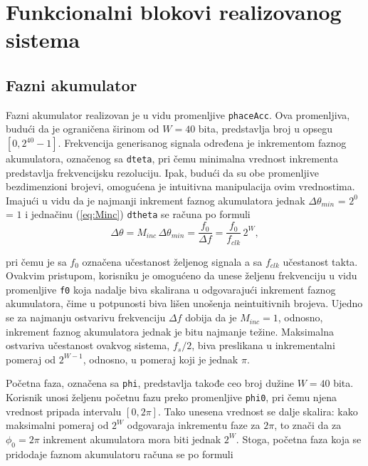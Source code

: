 \documentclass[conference]{IEEEtran}
\begin{document}
\section{Funkcionalni blokovi realizovanog sistema}\label{sekcija:kod}
\subsection{Fazni akumulator}
Fazni akumulator realizovan je u vidu promenljive \texttt{phaceAcc}. Ova promenljiva, budući da je ograničena širinom od $W=40$ bita, predstavlja broj u opsegu $[0, 2^{40}-1]$. Frekvencija generisanog signala određena je inkrementom faznog akumulatora, označenog sa \texttt{dteta}, pri čemu minimalna vrednost inkrementa predstavlja frekvencijsku rezoluciju. Ipak, budući da su obe promenljive bezdimenzioni brojevi, omogućena je intuitivna manipulacija ovim vrednostima. Imajući u vidu da je najmanji inkrement faznog akumulatora jednak $\Delta \theta_{min}$ = $2^0$ = $1$ i jednačinu (\ref{eq:Minc}) \texttt{dtheta} se računa po formuli
\\
\begin{equation}
\Delta \theta = M_{inc}\,\Delta \theta_{min} = \frac{f_0}{\Delta f} = \frac{f_{0}}{f_{clk}}\,2^W ,
\end{equation}

\noindent pri čemu je sa $f_{0}$ označena učestanost željenog signala a sa $f_{clk}$ učestanost takta. Ovakvim pristupom, korisniku je omogućeno da unese željenu frekvenciju u vidu promenljive \texttt{f0} koja nadalje biva skalirana u odgovarajući inkrement faznog akumulatora, čime u potpunosti biva lišen unošenja neintuitivnih brojeva. Ujedno se za najmanju ostvarivu frekvenciju $\Delta f$ dobija da je $M_{inc}=1$, odnosno, inkrement faznog akumulatora jednak je bitu najmanje težine. Maksimalna ostvariva učestanost ovakvog sistema, $f_s/2$, biva preslikana u inkrementalni pomeraj od $2^{W-1}$, odnosno, u pomeraj koji je jednak $\pi$.

Početna faza, označena sa \texttt{phi}, predstavlja takođe ceo broj dužine $W=40$ bita. Korisnik unosi željenu početnu fazu preko promenljive \texttt{phi0}, pri čemu njena vrednost pripada intervalu $[0, 2\pi]$. Tako unesena vrednost se dalje skalira: kako maksimalni pomeraj od $2^W$ odgovaraja inkrementu faze za $2\pi$, to znači da za $\phi_0 = 2\pi$ inkrement akumulatora mora biti jednak $2^W$. Stoga, početna faza koja se pridodaje faznom akumulatoru računa se po formuli
\end{document}
